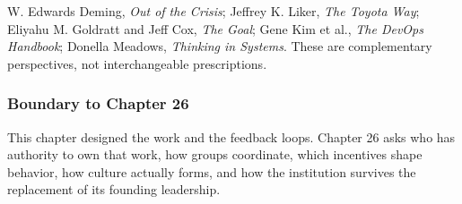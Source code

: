 W. Edwards Deming, \textit{Out of the Crisis}; Jeffrey K. Liker, \textit{The Toyota Way}; Eliyahu M. Goldratt and Jeff Cox, \textit{The Goal}; Gene Kim et al., \textit{The DevOps Handbook}; Donella Meadows, \textit{Thinking in Systems}. These are complementary perspectives, not interchangeable prescriptions.

\subsubsection*{Boundary to Chapter 26}

This chapter designed the work and the feedback loops. Chapter 26 asks who has authority to own that work, how groups coordinate, which incentives shape behavior, how culture actually forms, and how the institution survives the replacement of its founding leadership.

